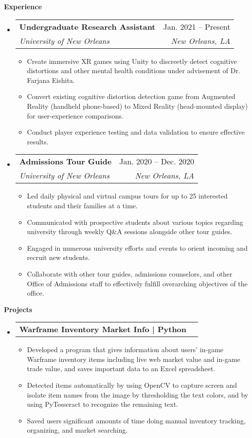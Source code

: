 \documentclass[letterpaper,12pt]{article}[leftmargin=*]
\makeatletter
\def \entryspacing {-0pt}
\renewcommand{\section}[2]{\vspace{5pt}
  \colorbox{secondary}{\color{white}\raggedbottom\normalsize\textbf{{#1}{\hspace{7pt}#2}}}
}
\newcommand{\resumeEntryStart}{\begin{itemize}[leftmargin=2.5mm]}
\newcommand{\resumeEntryEnd}{\end{itemize}\vspace{\entryspacing}}
\newcommand{\resumeItemListStart}{\begin{itemize}[leftmargin=4.5mm]}
\newcommand{\resumeItemListEnd}{\end{itemize}}
\newcommand{\resumeItem}[1]{
  \item\small{
    {#1 \vspace{-2pt}}
  }
}
\newcommand{\resumeEntryTSDL}[4]{
  \vspace{-1pt}\item[]
    \begin{tabularx}{0.97\textwidth}{X@{\hspace{60pt}}r}
      \textbf{\color{primary}#1} & {\firabook\color{accent}\small#2} \\
      \textit{\color{accent}\small#3} & \textit{\color{accent}\small#4} \\
    \end{tabularx}\vspace{-6pt}
}
\newcommand{\resumeEntryTD}[2]{
  \vspace{-1pt}\item[]
    \begin{tabularx}{0.97\textwidth}{X@{\hspace{60pt}}r}
      \textbf{\color{primary}#1} & {\firabook\color{accent}\small#2} \\
    \end{tabularx}\vspace{-6pt}
}
\makeatother
\begin{document}
\section{\faPieChart}{Experience}

  \resumeEntryStart
    \resumeEntryTSDL
      {Undergraduate Research Assistant}{Jan. 2021 -- Present}
      {University of New Orleans}{New Orleans, LA}
    \resumeItemListStart
      \resumeItem {Create immersive XR games using Unity to discreetly detect cognitive distortions and other mental health conditions under advisement of Dr. Farjana Eishita.}
      \resumeItem {Convert existing cognitive distortion detection game from Augmented Reality (handheld phone-based) to Mixed Reality (head-mounted display) for user-experience comparisons.}
       \resumeItem {Conduct player experience testing and data validation to ensure effective results.}
    \resumeItemListEnd
  \resumeEntryEnd

  \resumeEntryStart
    \resumeEntryTSDL
      {Admissions Tour Guide}{Jan. 2020 -- Dec. 2020}
      {University of New Orleans}{New Orleans, LA}
    \resumeItemListStart
      \resumeItem {Led daily physical and virtual campus tours for up to 25 interested students and their families at a time.}
      \resumeItem {Communicated with prospective students about various topics regarding university through weekly Q\&A sessions alongside other tour guides.}
      \resumeItem {Engaged in numerous university efforts and events to orient incoming and recruit new students.}
      \resumeItem {Collaborate with other tour guides, admissions counselors, and other Office of Admissions staff to effectively fulfill overarching objectives of the office.}
    \resumeItemListEnd
  \resumeEntryEnd


\section{\faFlask}{Projects}

\resumeEntryStart
    \resumeEntryTD
      {Warframe Inventory Market Info | Python}{}
    \resumeItemListStart
      \resumeItem {Developed a program that gives information about users' in-game Warframe inventory items including live web market value and in-game trade value, and saves important data to an Excel spreadsheet.}
       \resumeItem {Detected items automatically by using OpenCV to capture screen and isolate item names from the image by thresholding the text colors, and by using PyTesseract to recognize the remaining text.}
        \resumeItem {Saved users significant amounts of time doing manual inventory tracking, organizing, and market searching.}
    \resumeItemListEnd
  \resumeEntryEnd
  
\end{document}
